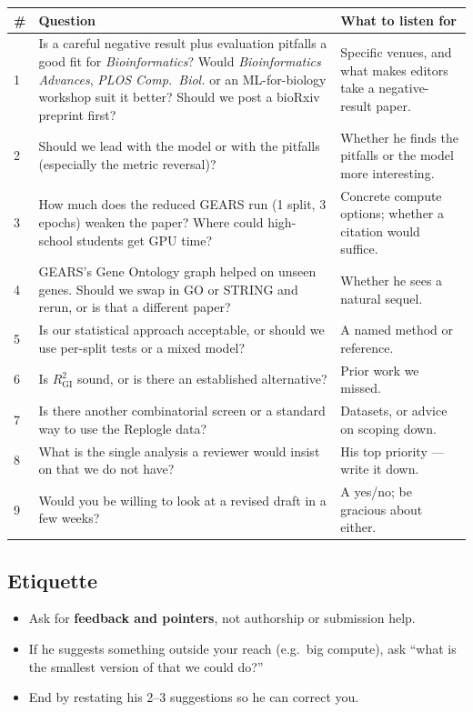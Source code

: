 \documentclass[10.5pt]{article}
\begin{document}
\begin{tabular}{@{}p{0.6cm}p{8.4cm}p{6.5cm}@{}}
\toprule
\# & Question & What to listen for\\
\midrule
1 & Is a careful negative result plus evaluation pitfalls a good fit for \emph{Bioinformatics}? Would
\emph{Bioinformatics Advances}, \emph{PLOS Comp.\ Biol.} or an ML-for-biology workshop suit it better? Should we
post a bioRxiv preprint first? & Specific venues, and what makes editors take a negative-result paper.\\
2 & Should we lead with the model or with the pitfalls (especially the metric reversal)? & Whether he finds the
pitfalls or the model more interesting.\\
3 & How much does the reduced GEARS run (1 split, 3 epochs) weaken the paper? Where could high-school students
get GPU time? & Concrete compute options; whether a citation would suffice.\\
4 & GEARS's Gene Ontology graph helped on unseen genes. Should we swap in GO or STRING and rerun, or is that a
different paper? & Whether he sees a natural sequel.\\
5 & Is our statistical approach acceptable, or should we use per-split tests or a mixed model? & A named method or
reference.\\
6 & Is $R^2_{\mathrm{GI}}$ sound, or is there an established alternative? & Prior work we missed.\\
7 & Is there another combinatorial screen or a standard way to use the Replogle data? & Datasets, or advice on
scoping down.\\
8 & What is the single analysis a reviewer would insist on that we do not have? & His top priority --- write it down.\\
9 & Would you be willing to look at a revised draft in a few weeks? & A yes/no; be gracious about either.\\
\bottomrule
\end{tabular}

\subsection*{Etiquette}
\begin{itemize}
\item Ask for \textbf{feedback and pointers}, not authorship or submission help.
\item If he suggests something outside your reach (e.g.\ big compute), ask ``what is the smallest version of
that we could do?''
\item End by restating his 2--3 suggestions so he can correct you.
\end{itemize}
\end{document}
